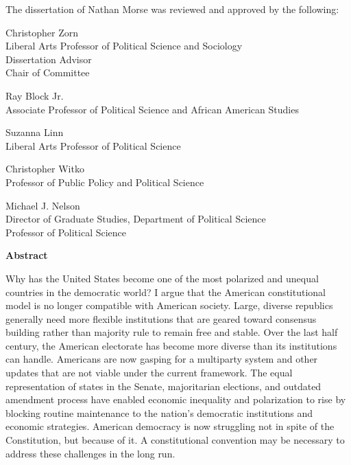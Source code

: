 \newpage
\begin{flushleft}
The dissertation of Nathan Morse was reviewed and approved by the following:
\vspace{2em}

Christopher Zorn\\
Liberal Arts Professor of Political Science and Sociology\\
Dissertation Advisor\\
Chair of Committee

\vspace{1em} %

Ray Block Jr.\\
Associate Professor of Political Science and African American Studies

\vspace{1em} %

Suzanna Linn\\
Liberal Arts Professor of Political Science

\vspace{1em} %

Christopher Witko\\
Professor of Public Policy and Political Science

\vspace{1em} %

Michael J. Nelson\\
Director of Graduate Studies, Department of Political Science\\
Professor of Political Science

\end{flushleft}

\newpage
\begin{center}
\textbf{Abstract}
\end{center}

Why has the United States become one of the most polarized and unequal countries in the democratic world? I argue that the American constitutional model is no longer compatible with American society. Large, diverse republics generally need more flexible institutions that are geared toward consensus building rather than majority rule to remain free and stable. Over the last half century, the American electorate has become more diverse than its institutions can handle. Americans are now gasping for a multiparty system and other updates that are not viable under the current framework. The equal representation of states in the Senate, majoritarian elections, and outdated amendment process have enabled economic inequality and polarization to rise by blocking routine maintenance to the nation’s democratic institutions and economic strategies. American democracy is now struggling not in spite of the Constitution, but because of it. A constitutional convention may be necessary to address these challenges in the long run.

